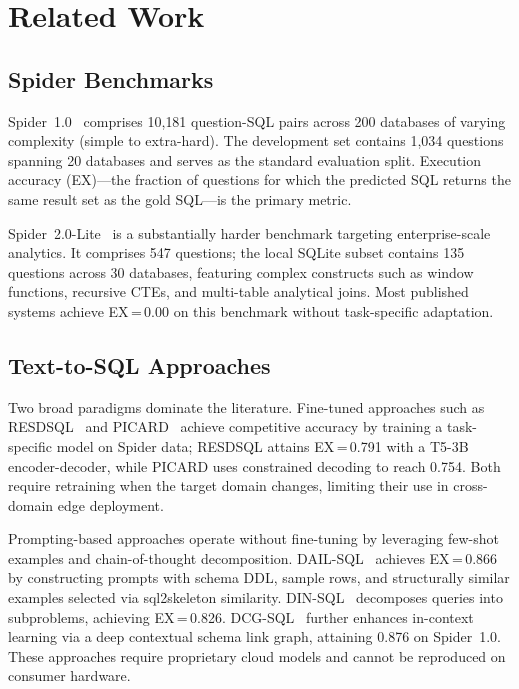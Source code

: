\section{Related Work}
\label{sec:background}

\subsection{Spider Benchmarks}

Spider~1.0~\citep{yu2018spider} comprises 10{,}181 question-SQL pairs across
200 databases of varying complexity (simple to extra-hard).
The development set contains 1{,}034 questions spanning 20 databases and
serves as the standard evaluation split.
Execution accuracy (EX)---the fraction of questions for which the predicted
SQL returns the same result set as the gold SQL---is the primary metric.

Spider~2.0-Lite~\citep{lei2025spider2} is a substantially harder benchmark
targeting enterprise-scale analytics.
It comprises 547 questions; the local SQLite subset contains 135 questions
across 30 databases, featuring complex constructs such as window functions,
recursive CTEs, and multi-table analytical joins.
Most published systems achieve EX\,=\,0.00 on this benchmark without task-specific
adaptation.

\subsection{Text-to-SQL Approaches}

Two broad paradigms dominate the literature.
Fine-tuned approaches such as RESDSQL~\citep{li2023resdsql} and
PICARD~\citep{scholak2021picard} achieve competitive accuracy by training
a task-specific model on Spider data; RESDSQL attains EX\,=\,0.791 with a
T5-3B encoder-decoder, while PICARD uses constrained decoding to reach 0.754.
Both require retraining when the target domain changes, limiting their
use in cross-domain edge deployment.

Prompting-based approaches operate without fine-tuning by leveraging
few-shot examples and chain-of-thought decomposition.
DAIL-SQL~\citep{gao2023dailsql} achieves EX\,=\,0.866 by constructing
prompts with schema DDL, sample rows, and structurally similar examples
selected via sql2skeleton similarity.
DIN-SQL~\citep{pourreza2023dinsql} decomposes queries into subproblems,
achieving EX\,=\,0.826.
DCG-SQL~\citep{lee2025dcgsql} further enhances in-context learning via
a deep contextual schema link graph, attaining 0.876 on Spider~1.0.
These approaches require proprietary cloud models and cannot be
reproduced on consumer hardware.

